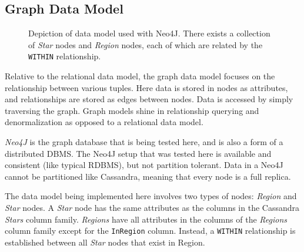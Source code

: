 
\subsection{Graph Data Model}\label{subsec:graphDataModel}
\begin{figure}
    \caption{Depiction of data model used with Neo4J.
    There exists a collection of \textit{Star} nodes and \textit{Region} nodes, each of which are related by the
    \texttt{WITHIN} relationship.}
\end{figure}

Relative to the relational data model, the graph data model focuses on the relationship between various tuples.
Here data is stored in nodes as attributes, and relationships are stored as edges between nodes.
Data is accessed by simply traversing the graph.
Graph models shine in relationship querying and denormalization as opposed to a relational data model.

\textit{Neo4J} is the graph database that is being tested here, and is also a form of a distributed DBMS\@.
The Neo4J setup that was tested here is available and consistent (like typical RDBMS), but not partition tolerant.
Data in a Neo4J cannot be partitioned like Cassandra, meaning that every node is a full replica.

The data model being implemented here involves two types of nodes: \textit{Region} and \textit{Star} nodes.
A \textit{Star} node has the same attributes as the columns in the Cassandra \textit{Stars} column family.
\textit{Regions} have all attributes in the columns of the \textit{Regions} column family except for the
\texttt{InRegion} column.
Instead, a \texttt{WITHIN} relationship is established between all \textit{Star} nodes that exist in Region.

